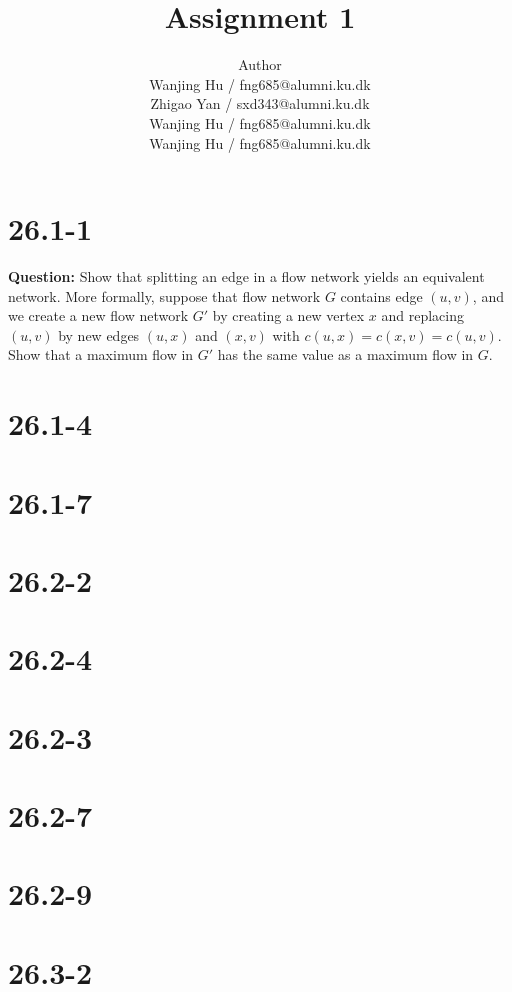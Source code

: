 \documentclass[11pt]{article}
\title{Assignment 1}
\author{Author \\
  Wanjing Hu / fng685@alumni.ku.dk  \\
  Zhigao Yan / sxd343@alumni.ku.dk  \\
  Wanjing Hu / fng685@alumni.ku.dk  \\
  Wanjing Hu / fng685@alumni.ku.dk  \\
}
\begin{document}
\maketitle


\section{26.1-1}
\textbf{Question: }Show that splitting an edge in a flow network yields an equivalent network. More formally, suppose that flow network $G$ contains edge $(u, v)$, and we create a new flow network $G'$ by creating a new vertex $x$ and replacing $(u, v)$ by new edges $(u, x)$ and $(x, v)$ with $c(u, x) = c(x, v) = c(u, v)$. Show that a maximum flow in $G'$ has the same value as a maximum flow in $G$.

\section{26.1-4}

\section{26.1-7}

\section{26.2-2}
\section{26.2-4}
\section{26.2-3}
\section{26.2-7}
\section{26.2-9}
\section{26.3-2}
\end{document}
